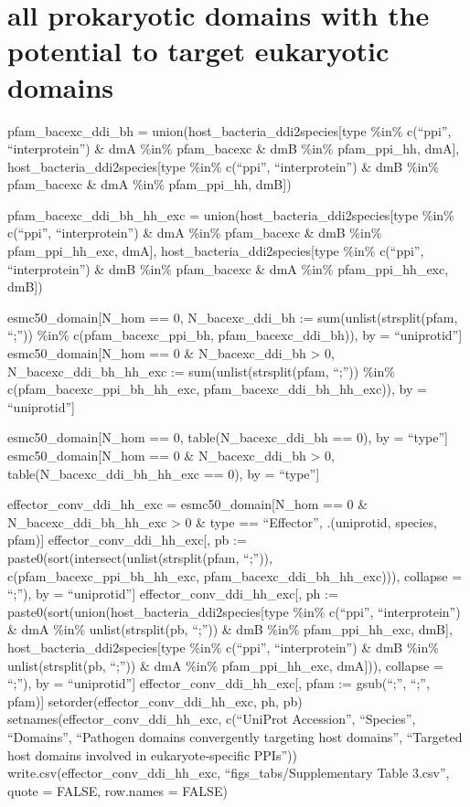 \documentclass[
]{article}
\begin{document}
\hypertarget{all-prokaryotic-domains-with-the-potential-to-target-eukaryotic-domains}{%
\section{all prokaryotic domains with the potential to target eukaryotic
domains}\label{all-prokaryotic-domains-with-the-potential-to-target-eukaryotic-domains}}

pfam\_bacexc\_ddi\_bh = union(host\_bacteria\_ddi2species{[}type \%in\%
c(``ppi'', ``interprotein'') \& dmA \%in\% pfam\_bacexc \& dmB \%in\%
pfam\_ppi\_hh, dmA{]}, host\_bacteria\_ddi2species{[}type \%in\%
c(``ppi'', ``interprotein'') \& dmB \%in\% pfam\_bacexc \& dmA \%in\%
pfam\_ppi\_hh, dmB{]})

pfam\_bacexc\_ddi\_bh\_hh\_exc =
union(host\_bacteria\_ddi2species{[}type \%in\% c(``ppi'',
``interprotein'') \& dmA \%in\% pfam\_bacexc \& dmB \%in\%
pfam\_ppi\_hh\_exc, dmA{]}, host\_bacteria\_ddi2species{[}type \%in\%
c(``ppi'', ``interprotein'') \& dmB \%in\% pfam\_bacexc \& dmA \%in\%
pfam\_ppi\_hh\_exc, dmB{]})

esmc50\_domain{[}N\_hom == 0, N\_bacexc\_ddi\_bh :=
sum(unlist(strsplit(pfam, ``;'')) \%in\% c(pfam\_bacexc\_ppi\_bh,
pfam\_bacexc\_ddi\_bh)), by = ``uniprotid''{]} esmc50\_domain{[}N\_hom
== 0 \& N\_bacexc\_ddi\_bh \textgreater{} 0, N\_bacexc\_ddi\_bh\_hh\_exc
:= sum(unlist(strsplit(pfam, ``;'')) \%in\%
c(pfam\_bacexc\_ppi\_bh\_hh\_exc, pfam\_bacexc\_ddi\_bh\_hh\_exc)), by =
``uniprotid''{]}

esmc50\_domain{[}N\_hom == 0, table(N\_bacexc\_ddi\_bh == 0), by =
``type''{]} esmc50\_domain{[}N\_hom == 0 \& N\_bacexc\_ddi\_bh
\textgreater{} 0, table(N\_bacexc\_ddi\_bh\_hh\_exc == 0), by =
``type''{]}

effector\_conv\_ddi\_hh\_exc = esmc50\_domain{[}N\_hom == 0 \&
N\_bacexc\_ddi\_bh\_hh\_exc \textgreater{} 0 \& type == ``Effector'',
.(uniprotid, species, pfam){]} effector\_conv\_ddi\_hh\_exc{[}, pb :=
paste0(sort(intersect(unlist(strsplit(pfam, ``;'')),
c(pfam\_bacexc\_ppi\_bh\_hh\_exc, pfam\_bacexc\_ddi\_bh\_hh\_exc))),
collapse = ``;''), by = ``uniprotid''{]}
effector\_conv\_ddi\_hh\_exc{[}, ph :=
paste0(sort(union(host\_bacteria\_ddi2species{[}type \%in\% c(``ppi'',
``interprotein'') \& dmA \%in\% unlist(strsplit(pb, ``;'')) \& dmB
\%in\% pfam\_ppi\_hh\_exc, dmB{]}, host\_bacteria\_ddi2species{[}type
\%in\% c(``ppi'', ``interprotein'') \& dmB \%in\% unlist(strsplit(pb,
``;'')) \& dmA \%in\% pfam\_ppi\_hh\_exc, dmA{]})), collapse = ``;''),
by = ``uniprotid''{]} effector\_conv\_ddi\_hh\_exc{[}, pfam :=
gsub(``;'', ``;'', pfam){]} setorder(effector\_conv\_ddi\_hh\_exc, ph,
pb) setnames(effector\_conv\_ddi\_hh\_exc, c(``UniProt Accession'',
``Species'', ``Domains'', ``Pathogen domains convergently targeting host
domains'', ``Targeted host domains involved in eukaryote-specific
PPIs'')) write.csv(effector\_conv\_ddi\_hh\_exc,
``figs\_tabs/Supplementary Table 3.csv'', quote = FALSE, row.names =
FALSE)
\end{document}
